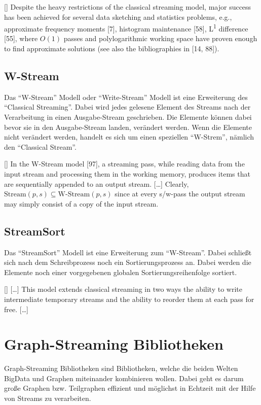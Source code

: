 [\cite{Ribichini2007}]{
Despite the heavy restrictions of the classical streaming model, major
success has been achieved for several data sketching and statistics problems,
e.g., approximate frequency moments [7], histogram maintenance [58],
L\textsuperscript{1} difference [55], where $O(1)$ passes and polylogarithmic
working space have proven enough to find approximate solutions (see also the
bibliographies in [14, 88]).
}

\subsection{W-Stream}
Das \enquote{W-Stream} Modell oder \enquote{Write-Stream} Modell ist eine
Erweiterung des \enquote{Classical Streaming}. Dabei wird jedes gelesene Element
des Streams nach der Verarbeitung in einen Ausgabe-Stream geschrieben. Die
Elemente können dabei bevor sie in den Ausgabe-Stream landen, verändert werden.
Wenn die Elemente nicht verändert werden, handelt es sich um einen speziellen
\enquote{W-Strem}, nämlich den \enquote{Classical Stream}.

[\cite{Ribichini2007}]{
In the W-Stream model [97], a streaming pass, while reading data from
the input stream and processing them in the working memory, produces items
that are sequentially appended to an output stream. [\dots]
Clearly, $\text{Stream}(p, s) \subseteq \text{W-Stream}(p, s)$ since at every
s/w-pass the output stream may simply consist of a copy of the input stream.
}

\subsection{StreamSort}
Das \enquote{StreamSort} Modell ist eine Erweiterung zum \enquote{W-Stream}.
Dabei schließt sich nach dem Schreibprozess noch ein Sortierungsprozess an. Dabei
werden die Elemente noch einer vorgegebenen globalen Sortierungsreihenfolge
sortiert.

[\cite{Ribichini2007}]{
[\dots] This model extends classical streaming in two ways the ability to write
intermediate temporary streams and the ability to reorder them at each pass for
free. [\dots]
}

\section{Graph-Streaming Bibliotheken}
Graph-Streaming Bibliotheken sind Bibliotheken, welche die beiden Welten
\gls{BigData} und Graphen miteinander kombinieren wollen. Dabei geht es darum
große Graphen bzw. Teilgraphen effizient und möglichst in Echtzeit mit der Hilfe
von Streams zu verarbeiten.

